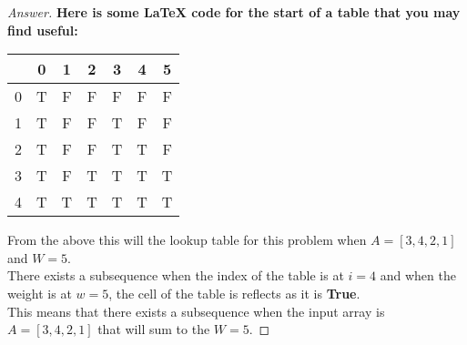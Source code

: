 \documentclass[11pt]{article}
\theoremstyle{definition}
\theoremstyle{definition}
\theoremstyle{definition}
\begin{document}
\begin{proof}[Answer]
\textbf{Here is some LaTeX code for the start of a table that you may find useful:}

\begin{tabular}{|r|c|c|c|c|c|c|}
\hline
& 0 & 1 & 2 & 3 & 4 & 5  \\ 
   \hline
0 & T & F & F & F & F & F  \\ 
\hline
1 & T & F & F & T & F & F  \\ 
\hline
2 & T& F & F & T & T & F  \\ 
\hline
3 & T & F & T & T & T & T  \\ 
\hline
4 & T & T & T & T & T & T  \\ 
\hline
\end{tabular}

From the above this will the lookup table for this problem when $A = [3,4,2,1]$ and $W = 5$. \\

There exists a subsequence when the index of the table is at $i = 4$ and when the weight is at $w =5$, the cell of the table is reflects as it is \textbf{True}.\\

This means that there exists a subsequence when the input array is $A = [3,4,2,1]$ that will sum to the $W = 5$.


\end{proof}

\end{document}
